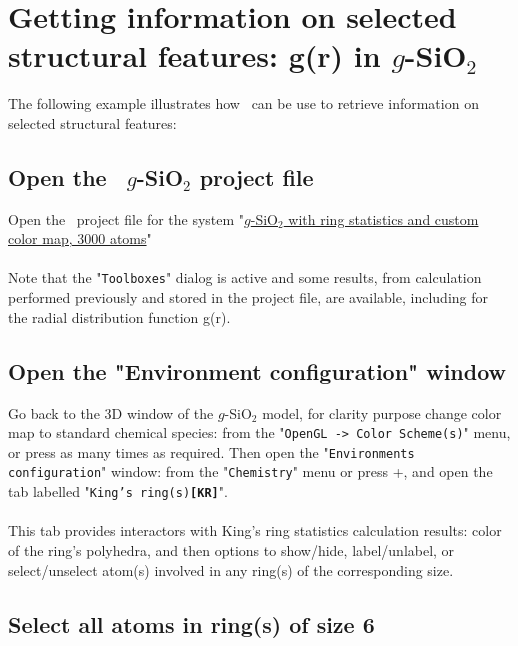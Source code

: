 \chapter{ Getting information on selected structural features: g(r) in $g$-SiO$_2$}
\label{tuto-9}

The following example illustrates how \atomes\ can be use to retrieve information on selected structural features:

\section{Open the \atomes\ $g$-SiO$_2$ project file}

Open the \atomes\ project file for the system "\href{http://atomes.ipcms.fr/wp-content/uploads/2022/08/gSiO2-custom-rings.tar.bz2}{$g$-SiO$_2$ with ring statistics and custom color map, 3000 atoms}" \\[0.25cm]
\\
Note that the "\texttt{Toolboxes}" dialog is active and some results, from calculation performed previously and stored in the project file, 
are available, including for the radial distribution function g(r). 

\clearpage

\section{Open the "Environment configuration" window}

Go back to the 3D window of the $g$-SiO$_2$ model, 
for clarity purpose change color map to standard chemical species: from the "\texttt{OpenGL~->~Color~Scheme(s)}" menu, or press  as many times as required. 
Then open the "\texttt{Environments configuration}" window: from the "\texttt{Chemistry}" menu or press \Ctrl+, and open the tab labelled "\texttt{King's~ring(s){\bf{[KR]}}}". \\[0.5cm]
\mapenvfig 
\\[0.5cm]
This tab provides interactors with King's ring statistics calculation results: color of the ring's polyhedra, and then options to show/hide, label/unlabel, 
or select/unselect atom(s) involved in any ring(s) of the corresponding size.

\clearpage

\section{Select all atoms in ring(s) of size 6}

